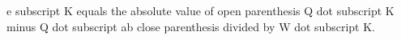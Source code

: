 e subscript K equals the absolute value of open parenthesis Q dot subscript K minus Q dot subscript ab close parenthesis divided by W dot subscript K.